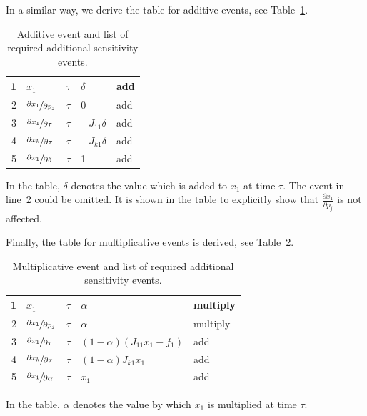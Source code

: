 \documentclass[journal, a4paper]{IEEEtran}
\begin{document}
In a similar way, we derive the table for additive events, see Table~\ref{tab:additive}.
\begin{table}[ht]
\caption{Additive event and list of required additional sensitivity events.}
\label{tab:additive}
\begin{center}
\begin{tabular}{|r|l|l|l|l|}\hline
     1 & $x_1$ & $\tau$ & $\delta$ & add \\
     \hline
     2 & $\sfrac{\partial x_1}{\partial p_j}$ & $\tau$ & $0$ & add \\
     3 & $\sfrac{\partial x_1}{\partial \tau}$ & $\tau$ & $-J_{11}\delta$ & add \\
     4 & $\sfrac{\partial x_k}{\partial \tau}$ & $\tau$ & $-J_{k1}\delta$ & add \\
     5 &$\sfrac{\partial x_1}{\partial \delta}$ & $\tau$ & 1 & add \\
     \hline
\end{tabular}
\end{center}
\end{table}
In the table, $\delta$ denotes the value which is added to $x_1$ at time $\tau$. The event in line~2 could be omitted. It is shown in the table to explicitly show that $\frac{\partial x_1}{\partial p_j}$ is not affected.

Finally, the table for multiplicative events is derived, see Table~\ref{tab:multi}.
\begin{table}[ht]
\caption{Multiplicative event and list of required additional sensitivity events.}
\label{tab:multi}
\begin{center}
\begin{tabular}{|r|l|l|l|l|}\hline
     1 & $x_1$ & $\tau$ & $\alpha$ & multiply \\
     \hline
     2 & $\sfrac{\partial x_1}{\partial p_j}$ & $\tau$ & $\alpha$ & multiply \\
     3 & $\sfrac{\partial x_1}{\partial \tau}$ & $\tau$ & $(1-\alpha)(J_{11}x_1-f_1)$ & add \\
     4 & $\sfrac{\partial x_k}{\partial \tau}$ & $\tau$ & $(1-\alpha)J_{k1}x_1$ & add \\
     5 &$\sfrac{\partial x_1}{\partial \alpha}$ & $\tau$ & $x_1$ & add \\
     \hline
\end{tabular}
\end{center}
\end{table}
In the table, $\alpha$ denotes the value by which $x_1$ is multiplied at time $\tau$.
\end{document}
